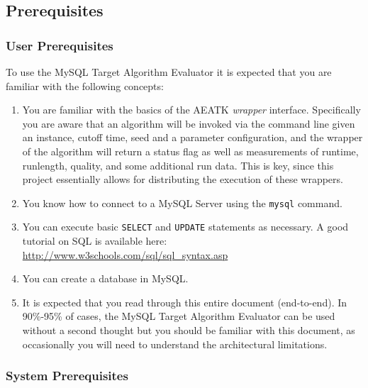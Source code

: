 \documentclass[11pt,letterpaper,oneside]{article}
\begin{document}
\subsection{Prerequisites}

\subsubsection{User Prerequisites}

To use the MySQL Target Algorithm Evaluator it is expected that you are familiar with the following concepts:

\begin{enumerate}

\item You are familiar with the basics of the AEATK \emph{wrapper} interface. Specifically you are aware that an algorithm will be invoked via the command line given an instance, cutoff time, seed and a parameter configuration, and the wrapper of the algorithm will return a status flag as well as measurements of runtime, runlength, quality, and some additional run data. This is key, since this project essentially allows for distributing the execution of these wrappers.

\item You know how to connect to a MySQL Server using the \texttt{mysql} command.

\item You can execute basic \texttt{SELECT} and \texttt{UPDATE} statements as necessary. A good tutorial on SQL is available here: \url{http://www.w3schools.com/sql/sql\_syntax.asp}

\item You can create a database in MySQL.

\item It is expected that you read through this entire document (end-to-end). In 90\%-95\% of cases, the MySQL Target Algorithm Evaluator can be used without a second thought but you should be familiar with this document, as occasionally you will need to understand the architectural limitations.

\end{enumerate}

\subsubsection{System Prerequisites}
\end{document}
